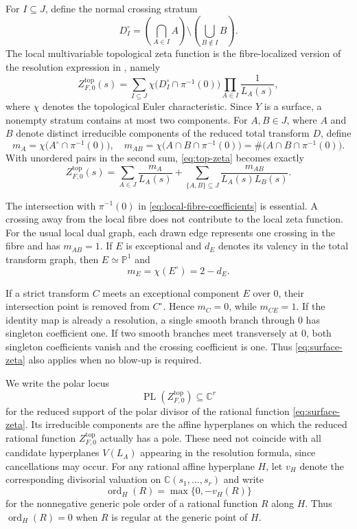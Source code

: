 \documentclass[12pt]{amsart}
\numberwithin{equation}{section}
\theoremstyle{plain}
\theoremstyle{definition}
\theoremstyle{remark}
\theoremstyle{definition}
\DeclareMathOperator{\PL}{PL}
\DeclareMathOperator{\ord}{ord}
\newcommand{\C}{\mathbb C}
\begin{document}
For $I\subseteq J$, define the normal crossing stratum
\[
    D_{I}^\circ = \left(\bigcap_{A\in I}A\right) \setminus \left(\bigcup_{B\notin I}B\right).
\]
The local multivariable topological zeta function is the fibre-localized version of the resolution expression in \cite[\S1.3]{Budur2015}, namely
\begin{equation}\label{eq:top-zeta}
    Z^{\mathrm{top}}_{F,0}(s) = \sum_{I\subseteq J} \chi\bigl( D_{I}^\circ\cap\pi^{-1}(0)\bigr) \prod_{A\in I}\frac{1}{L_A(s)},
\end{equation}
where $\chi$ denotes the topological Euler characteristic. Since $Y$ is a surface, a nonempty stratum contains at most two components. For $A,B\in {J}$, where $A$ and $B$ denote distinct irreducible components of the reduced total transform $D$, define
\begin{equation}\label{eq:local-fibre-coefficients}
    m_A = \chi\bigl(A^\circ\cap\pi^{-1}(0)\bigr), \quad m_{AB} = \chi\bigl(A\cap B\cap\pi^{-1}(0)\bigr) = \#\bigl(A\cap B\cap\pi^{-1}(0)\bigr).
\end{equation}
With unordered pairs in the second sum, \eqref{eq:top-zeta} becomes exactly
\begin{equation}\label{eq:surface-zeta}
 Z^{\mathrm{top}}_{F,0}(s)
 =
 \sum_{A\in J}\frac{m_A}{L_A(s)}
 +
 \sum_{\{A,B\}\subseteq J}
 \frac{m_{AB}}{L_A(s)L_B(s)}.
\end{equation}

The intersection with $\pi^{-1}(0)$ in \eqref{eq:local-fibre-coefficients} is essential. A crossing away from the local fibre does not contribute to the local zeta function. For the usual local dual graph, each drawn edge represents one crossing in the fibre and has $m_{AB}=1$. If $E$ is exceptional and $d_E$ denotes its valency in the total transform graph, then $E\simeq\mathbb P^1$ and 
\begin{equation}\label{eq:exceptional-euler}
 m_E=\chi(E^\circ)=2-d_E.
\end{equation}

If a strict transform $C$ meets an exceptional component $E$ over $0$, their intersection point is removed from $C^\circ$. Hence $m_C=0$, while $m_{CE}=1$. If the identity map is already a resolution, a single smooth branch through $0$ has singleton coefficient one. If two smooth branches meet transversely at $0$, both singleton coefficients vanish and the crossing coefficient is one. Thus \eqref{eq:surface-zeta} also applies when no blow-up is required.


We write the polar locus
\[
  \PL(Z^{\mathrm{top}}_{F,0})
  \subseteq \mathbb C^r
\]
for the reduced support of the polar divisor of the rational function \eqref{eq:surface-zeta}. Its irreducible components are the affine hyperplanes on which the reduced rational function $Z^{\mathrm{top}}_{F,0}$ actually has a pole. These need not coincide with all candidate hyperplanes $V(L_A)$ appearing in the resolution formula, since cancellations may occur. For any rational affine hyperplane $H$, let $v_H$ denote the corresponding divisorial valuation on $\C(s_1,\ldots,s_r)$ and write
\[
 \ord_H(R)=\max\{0,-v_H(R)\}
\]
for the nonnegative generic pole order of a rational function $R$ along $H$. Thus $\ord_H(R)=0$ when $R$ is regular at the generic point of $H$.
\end{document}
